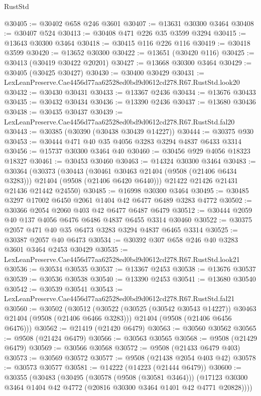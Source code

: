 \begin{lexlean}{RustStd}
\begin{coremodule}
@30405 := @30402 @658 @246 @3601
@30407 := @13631 @30300 @3464
@30408 := @30407 @524
@30413 := @30408 @471 @226 @35 @3599 @3294
@30415 := @13643 @30300 @3464
@30418 := @30415 @116 @226 @116
@30419 := @30418 @3599
@30420 := @13652 @30300
@30422 := @13651 (@30420 @116)
@30425 := @30413 (@30419 @30422 @20201)
@30427 := @13668 @30300 @3464
@30429 := @30405 (@30425 @30427)
@30430 := @30400 @30429
@30431 := LexLeanPreserve.Cae4456d77aa62528ed0bd9d0612cd278.R67.RustStd.look20
@30432 := @30430 @30431
@30433 := @13367 @2436
@30434 := @13676 @30433
@30435 := @30432 @30434
@30436 := @13390 @2436
@30437 := @13680 @30436
@30438 := @30435 @30437
@30439 := LexLeanPreserve.Cae4456d77aa62528ed0bd9d0612cd278.R67.RustStd.fal20
@30443 := @30385 (@30390 (@30438 @30439 @14227))
@30444 := @30375 @930
@30453 := @30444 @471 @40 @35 @4056 @3283 @3294 @4837 @6433 @3314
@30456 := @15737 @30300 @3464 @40
@30460 := @30456 @929 @4056 @18323 @18327
@30461 := @30453 @30460
@30463 := @14324 @30300 @3464
@30483 := @30364
    (@30373
      (@30443
        (@30461 @30463 @21404 (@9508 (@21406 @6434 @3283)))
        @21404
        (@9508 (@21406 @6420 @6440)))
      @21422
      @21426
      @21431
      @21436
      @21442
      @24550)
@30485 := @16998 @30300 @3464
@30495 := @30485 @3297 @17002 @6450 @2061 @1404 @42 @6477 @6489 @3283 @4772
@30502 := @30366 @2054 @2060 @403 @42 @6477 @6487 @6479
@30512 := @30444 @2059 @40 @137 @4056 @6476 @6486 @4837 @6455 @3314 @30460
@30522 := @30375 @2057 @471 @40 @35 @6473 @3283 @3294 @4837 @6465 @3314
@30525 := @30387 @2057 @40 @6473
@30534 := @30392 @307 @658 @246 @40 @3283 @3601 @3464 @2453 @30429
@30535 := LexLeanPreserve.Cae4456d77aa62528ed0bd9d0612cd278.R67.RustStd.look21
@30536 := @30534 @30535
@30537 := @13367 @2453
@30538 := @13676 @30537
@30539 := @30536 @30538
@30540 := @13390 @2453
@30541 := @13680 @30540
@30542 := @30539 @30541
@30543 := LexLeanPreserve.Cae4456d77aa62528ed0bd9d0612cd278.R67.RustStd.fal21
@30560 := @30502
    (@30512
      (@30522 (@30525 (@30542 @30543 @14227)) @30463 @21404 (@9508 (@21406 @6466 @3283)))
      @21404
      (@9508 (@21406 @6456 @6476)))
@30562 := @21419 (@21420 @6479)
@30563 := @30560 @30562
@30565 := @9508 (@21424 @6479)
@30566 := @30563 @30565
@30568 := @9508 (@21429 @6479)
@30569 := @30566 @30568
@30572 := @9508 (@21433 @6479 @403)
@30573 := @30569 @30572
@30577 := @9508 (@21438 @2054 @403 @42)
@30578 := @30573 @30577
@30581 := @14222 (@14223 (@21444 @6479))
@30600 := @30355
    (@30483
      (@30495
        (@30578 (@9508 (@30581 @3464)))
        (@17123 @30300 @3464 @1404 @42 @4772 (@20816 @30300 @3464 @1401 @42 @4771 @20828))))

\end{coremodule}
\end{lexlean}
